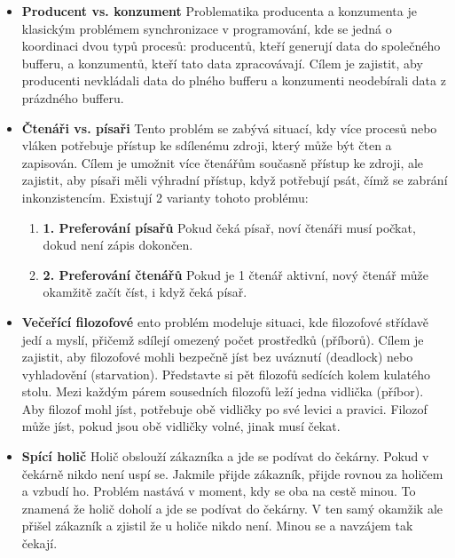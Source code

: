 \begin{itemize}
    \item \textbf{Producent vs. konzument}
    Problematika producenta a konzumenta je klasickým problémem synchronizace v programování, kde se jedná o koordinaci dvou typů procesů: producentů, kteří generují data do společného bufferu, a konzumentů, kteří tato data zpracovávají. Cílem je zajistit, aby producenti nevkládali data do plného bufferu a konzumenti neodebírali data z prázdného bufferu.
    \item \textbf{Čtenáři vs. písaři}
    Tento problém se zabývá situací, kdy více procesů nebo vláken potřebuje přístup ke sdílenému zdroji, který může být čten a zapisován. Cílem je umožnit více čtenářům současně přístup ke zdroji, ale zajistit, aby písaři měli výhradní přístup, když potřebují psát, čímž se zabrání inkonzistencím. Existují 2 varianty tohoto problému:
        \begin{enumerate}
            \item \textbf{1. Preferování písařů}
            Pokud čeká písař, noví čtenáři musí počkat, dokud není zápis dokončen.
            \item \textbf{2. Preferování čtenářů}
            Pokud je 1 čtenář aktivní, nový čtenář může okamžitě začít číst, i když čeká písař.
        \end{enumerate}
    \item \textbf{Večeřící filozofové}
    ento problém modeluje situaci, kde filozofové střídavě jedí a myslí, přičemž sdílejí omezený počet prostředků (příborů). Cílem je zajistit, aby filozofové mohli bezpečně jíst bez uváznutí (deadlock) nebo vyhladovění (starvation). Představte si pět filozofů sedících kolem kulatého stolu. Mezi každým párem sousedních filozofů leží jedna vidlička (příbor). Aby filozof mohl jíst, potřebuje obě vidličky po své levici a pravici. Filozof může jíst, pokud jsou obě vidličky volné, jinak musí čekat.
    \item \textbf{Spící holič}
    Holič obslouží zákazníka a jde se podívat do čekárny. Pokud v čekárně nikdo není uspí se. Jakmile přijde zákazník, přijde rovnou za holičem a vzbudí ho. Problém nastává v moment, kdy se oba na cestě minou. To znamená že holič doholí a jde se podívat do čekárny. V ten samý okamžik ale přišel zákazník a zjistil že u holiče nikdo není. Minou se a navzájem tak čekají.
\end{itemize}

